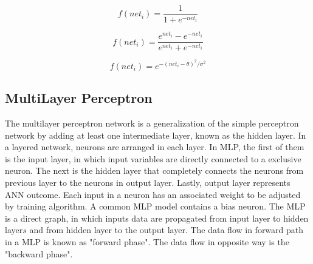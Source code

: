 \begin{equation}
\label{eq:logisticsigmoid_activation}
f(net_i) = \frac{1}{1 + e^{-net_i}}
\end{equation}

\begin{equation}
\label{eq:hiberbolictangent_activation}
f(net_i) = \frac{e^{net_i} - e^{-net_i}}{e^{net_i} + e^{-net_i}}
\end{equation}

\begin{equation}
\label{eq:gaussian_activation}
f(net_i) = e^{-(net_i - \theta)^2/\sigma^2}
\end{equation}

\subsection{MultiLayer Perceptron}

The multilayer perceptron network is a generalization of the simple perceptron network by adding at least one intermediate layer, known as the hidden layer. In a layered network, neurons are arranged in each layer. In MLP, the first of them is the input layer, in which input variables are directly connected to a exclusive neuron. The next is the hidden layer that completely connects the neurons from previous layer to the neurons in output layer. Lastly, output layer represents ANN outcome. Each input in a neuron has an associated weight to be adjusted by training algorithm. A common MLP model contains a bias neuron. The MLP is a direct graph, in which inputs data are propagated from input layer to hidden layer\(s\) and from hidden layer to the output layer. The data flow in forward path in a MLP is known as "forward phase". The data flow in opposite way is the "backward phase".

